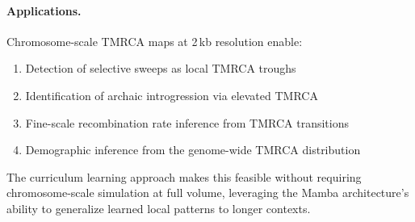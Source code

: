 \documentclass[11pt,a4paper]{article}
\begin{document}
\paragraph{Applications.} Chromosome-scale TMRCA maps at 2\,kb resolution enable:
\begin{enumerate}[nosep]
  \item Detection of selective sweeps as local TMRCA troughs
  \item Identification of archaic introgression via elevated TMRCA
  \item Fine-scale recombination rate inference from TMRCA transitions
  \item Demographic inference from the genome-wide TMRCA distribution
\end{enumerate}

\noindent The curriculum learning approach makes this feasible without requiring chromosome-scale simulation at full volume, leveraging the Mamba architecture's ability to generalize learned local patterns to longer contexts.
\end{document}
